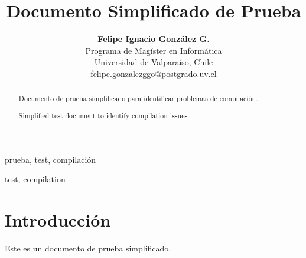 \documentclass[conference,a4paper]{IEEEtran}
\title{Documento Simplificado de Prueba}
\author{%
  \begin{tabular}{c}
    \textbf{Felipe Ignacio González G.}\\
    Programa de Magíster en Informática\\
    Universidad de Valparaíso, Chile\\
    \href{mailto:felipe.gonzalezggo@postgrado.uv.cl}{felipe.gonzalezggo@postgrado.uv.cl}
  \end{tabular}}
\begin{document}
\maketitle

\begin{abstract}
Documento de prueba simplificado para identificar problemas de compilación.
\end{abstract}

\begin{IEEEkeywords}
prueba, test, compilación
\end{IEEEkeywords}

\begin{abstract}
Simplified test document to identify compilation issues.
\end{abstract}

\begin{IEEEkeywords}
test, compilation
\end{IEEEkeywords}


\section{Introducción}\vspace{-0.2cm}
Este es un documento de prueba simplificado.

\flushend
\end{document}
